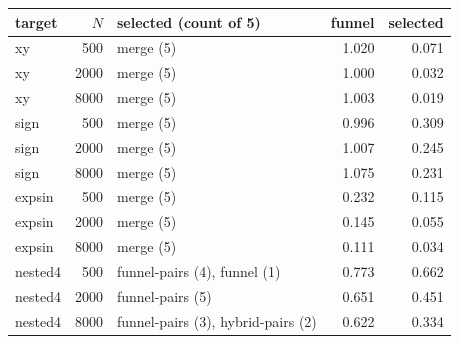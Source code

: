 \begin{tabular}{@{}lrlrr@{}}\toprule
target & $N$ & selected (count of 5) & funnel & selected\\\midrule
xy & 500 & merge (5) & 1.020 & 0.071\\
xy & 2000 & merge (5) & 1.000 & 0.032\\
xy & 8000 & merge (5) & 1.003 & 0.019\\
sign & 500 & merge (5) & 0.996 & 0.309\\
sign & 2000 & merge (5) & 1.007 & 0.245\\
sign & 8000 & merge (5) & 1.075 & 0.231\\
expsin & 500 & merge (5) & 0.232 & 0.115\\
expsin & 2000 & merge (5) & 0.145 & 0.055\\
expsin & 8000 & merge (5) & 0.111 & 0.034\\
nested4 & 500 & funnel-pairs (4), funnel (1) & 0.773 & 0.662\\
nested4 & 2000 & funnel-pairs (5) & 0.651 & 0.451\\
nested4 & 8000 & funnel-pairs (3), hybrid-pairs (2) & 0.622 & 0.334\\
\bottomrule\end{tabular}